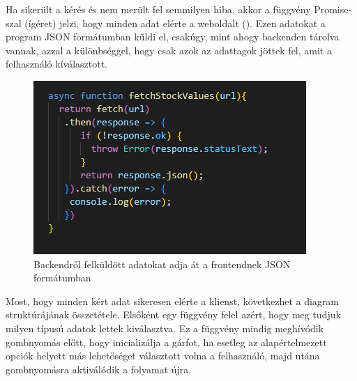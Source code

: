 
Ha sikerült a kérés és nem merült fel semmilyen hiba, akkor a függvény Promise-szal (ígéret) jelzi, hogy minden adat elérte a weboldalt (). Ezen adatokat a program JSON formátumban küldi el, csakúgy, mint ahogy backenden tárolva vannak, azzal a különbséggel, hogy csak azok az adattagok jöttek fel, amit a felhasználó kíválasztott.

\begin{figure}[h]
\centering
\includegraphics[scale=0.8]{images/fetch.png}
\caption{Backendről felküldött adatokat adja át a frontendnek JSON formátumban}
\label{fig:fetch}
\end{figure}

Most, hogy minden kért adat sikeresen elérte a klienst, következhet a diagram struktúrájának összetétele. Elsőként egy függvény felel azért, hogy meg tudjuk milyen típusú adatok lettek kiválasztva. Ez a függvény mindig meghívódik gombnyomás előtt, hogy inicializálja a gárfot, ha esetleg az alapértelmezett opciók helyett más lehetőséget választott volna a felhasználó, majd utána gombnyomásra aktiválódik a folyamat újra.

